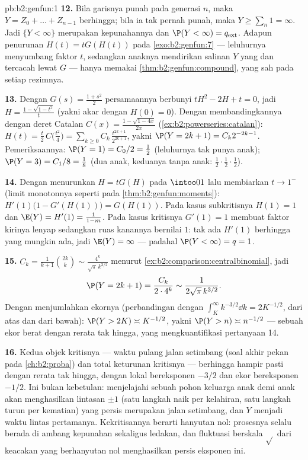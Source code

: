 \begin{solution}{pb:b2:genfun:1}
\textbf{12.} Bila garisnya punah pada generasi $n$, maka
$Y = Z_0 + \dots + Z_{n-1}$ berhingga; bila ia tak pernah
punah, maka $Y \geq \sum_n 1 = \infty$. Jadi $\{Y < \infty\}$ merupakan
 kepunahannya dan $\P(Y < \infty) = q_{\mathrm{ext}}$.
Adapun penurunan $H(t) = tG(H(t))$ pada
\cref{exo:b2:genfun:7} --- leluhurnya menyumbang
faktor $t$, sedangkan anaknya mendirikan salinan $Y$ yang  dan
tercacah lewat $G$ --- hanya memakai
\cref{thm:b2:genfun:compound}, yang sah pada setiap rezimnya.

\textbf{13.} Dengan $G(s) = \frac{1 + s^2}2$ persamaannya berbunyi
$tH^2 - 2H + t = 0$, jadi $H = \frac{1 - \sqrt{1 - t^2}}{t}$
(yakni akar dengan $H(0) = 0$). Dengan membandingkannya dengan deret Catalan
$C(x) = \frac{1 - \sqrt{1 - 4x}}{2x}$
(\cref{ex:b2:powerseries:catalan}): $H(t) = \frac
t2\,C\bigl(\frac{t^2}4\bigr) =
\sum_{k\geq0}C_k\,\frac{t^{2k+1}}{2^{2k+1}}$, yakni $\P(Y =
2k+1) = C_k2^{-2k-1}$. Pemeriksaannya: $\P(Y = 1) = C_0/2 = \frac12$
(leluhurnya tak punya anak); $\P(Y = 3) = C_1/8 = \frac18$
(dua anak, keduanya tanpa anak: $\frac12\cdot\frac12\cdot
\frac12$).

\textbf{14.} Dengan menurunkan $H = tG(H)$ pada $\intoo01$ lalu
membiarkan $t \to 1^-$ (limit monotonnya seperti pada
\cref{thm:b2:genfun:moments}): $H'(1)\bigl(1 - G'(H(1))\bigr)
= G(H(1))$. Pada kasus subkritisnya $H(1) = 1$ dan $\E(Y) =
H'(1) = \frac1{1 - m}$. Pada kasus kritisnya $G'(1) = 1$
membuat faktor kirinya lenyap sedangkan ruas kanannya bernilai $1$: tak ada
$H'(1)$ berhingga yang mungkin ada, jadi $\E(Y) = \infty$ --- padahal $\P(Y <
\infty) = q = 1$.

\textbf{15.} $C_k = \frac1{k+1}\binom{2k}k \sim
\frac{4^k}{\sqrt\pi\,k^{3/2}}$ menurut
\cref{ex:b2:comparison:centralbinomial}, jadi
\[
\P(Y = 2k+1) = \frac{C_k}{2\cdot4^{k}} \sim
\frac1{2\sqrt\pi\,k^{3/2}} .
\]
Dengan menjumlahkan ekornya (perbandingan dengan $\int_K^\infty
k^{-3/2}\dd k = 2K^{-1/2}$, dari atas dan dari bawah): $\P(Y > 2K)
\asymp K^{-1/2}$, yakni $\P(Y > n) \asymp n^{-1/2}$ --- sebuah
ekor berat dengan rerata tak hingga, yang mengkuantifikasi pertanyaan 14.

\textbf{16.} Kedua objek kritisnya --- waktu pulang jalan
setimbang (soal akhir pekan pada \cref{ch:b2:proba}) dan
total keturunan kritisnya --- berhingga hampir pasti dengan
rerata tak hingga, dengan  lokal bereksponen $-3/2$ dan ekor
bereksponen $-1/2$. Ini bukan kebetulan: menjelajahi sebuah
pohon keluarga anak demi anak akan menghasilkan lintasan $\pm1$ (satu langkah
naik per kelahiran, satu langkah turun per kematian) yang persis merupakan jalan
setimbang, dan $Y$ menjadi waktu lintas pertamanya. Kekritisannya berarti
hanyutan nol: prosesnya selalu berada di ambang kepunahan
sekaligus ledakan, dan fluktuasi berskala $\sqrt{}$
dari keacakan yang berhanyutan nol menghasilkan persis eksponen
ini.


\end{solution}
